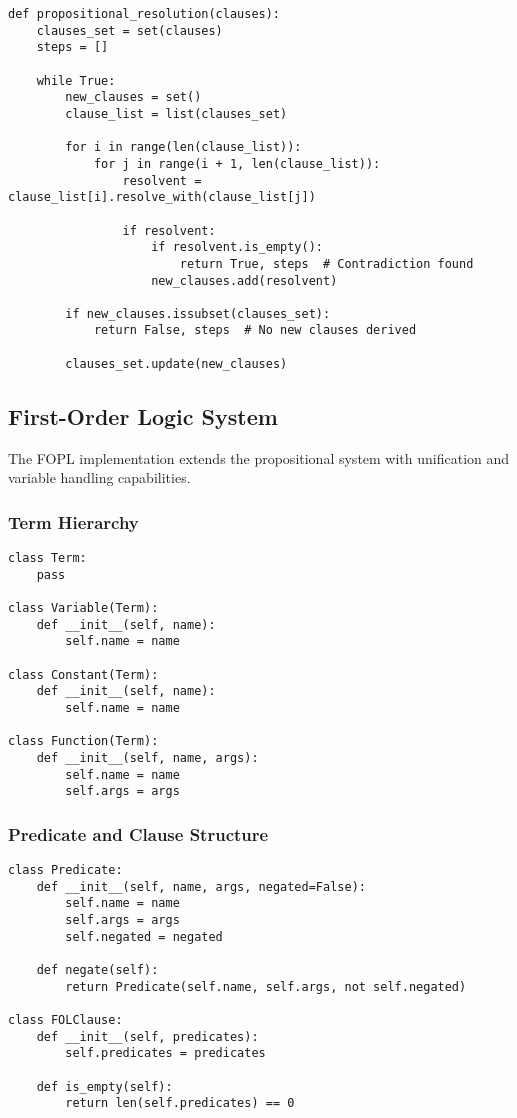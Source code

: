 \documentclass[11pt,a4paper]{article}
\begin{document}
\begin{lstlisting}[caption=Propositional Resolution Algorithm]
def propositional_resolution(clauses):
    clauses_set = set(clauses)
    steps = []
    
    while True:
        new_clauses = set()
        clause_list = list(clauses_set)
        
        for i in range(len(clause_list)):
            for j in range(i + 1, len(clause_list)):
                resolvent = clause_list[i].resolve_with(clause_list[j])
                
                if resolvent:
                    if resolvent.is_empty():
                        return True, steps  # Contradiction found
                    new_clauses.add(resolvent)
        
        if new_clauses.issubset(clauses_set):
            return False, steps  # No new clauses derived
        
        clauses_set.update(new_clauses)
\end{lstlisting}

\subsection{First-Order Logic System}

The FOPL implementation extends the propositional system with unification and variable handling capabilities.

\subsubsection{Term Hierarchy}

\begin{lstlisting}[caption=Term Structure Implementation]
class Term:
    pass

class Variable(Term):
    def __init__(self, name):
        self.name = name

class Constant(Term):
    def __init__(self, name):
        self.name = name

class Function(Term):
    def __init__(self, name, args):
        self.name = name
        self.args = args
\end{lstlisting}

\subsubsection{Predicate and Clause Structure}

\begin{lstlisting}[caption=FOPL Predicate Implementation]
class Predicate:
    def __init__(self, name, args, negated=False):
        self.name = name
        self.args = args
        self.negated = negated
    
    def negate(self):
        return Predicate(self.name, self.args, not self.negated)

class FOLClause:
    def __init__(self, predicates):
        self.predicates = predicates
    
    def is_empty(self):
        return len(self.predicates) == 0
\end{lstlisting}
\end{document}
